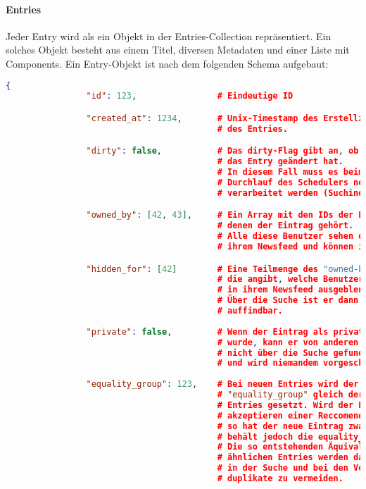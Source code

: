 	\paragraph{Entries} %
	\label{par:entries}
		
		Jeder Entry wird als ein Objekt in der Entries-Collection repräsentiert. Ein solches Objekt besteht aus einem Titel, diversen Metadaten und einer Liste mit Components. Ein Entry-Objekt ist nach dem folgenden Schema aufgebaut:

		\begin{lstlisting}[language=JSON]
			{
				"id": 123,                # Eindeutige ID

				"created_at": 1234,       # Unix-Timestamp des Erstellzeitpunktes 
				                          # des Entries.

				"dirty": false,           # Das dirty-Flag gibt an, ob sich
				                          # das Entry geändert hat.
				                          # In diesem Fall muss es beim nächsten
				                          # Durchlauf des Schedulers neu
				                          # verarbeitet werden (Suchindex, Vorschläge!).

				"owned_by": [42, 43],     # Ein Array mit den IDs der Benutzer,
				                          # denen der Eintrag gehört.
				                          # Alle diese Benutzer sehen den Eintrag in
				                          # ihrem Newsfeed und können ihn bearbeiten.

				"hidden_for": [42]        # Eine Teilmenge des "owned-by" Feldes, 
				                          # die angibt, welche Benutzer den Entry
				                          # in ihrem Newsfeed ausgeblendet haben.
				                          # Über die Suche ist er dann immernoch 
				                          # auffindbar.
				
				"private": false,         # Wenn der Eintrag als privat markiert
				                          # wurde, kann er von anderen Benutzern 
				                          # nicht über die Suche gefunden werden
				                          # und wird niemandem vorgeschlagen.
				
				"equality_group": 123,    # Bei neuen Entries wird der Wert 
				                          # "equality_group" gleich der id des
				                          # Entries gesetzt. Wird der Entry beim
				                          # akzeptieren einer Reccomendation geklont,
				                          # so hat der neue Eintrag zwar eine neue id,
				                          # behält jedoch die equality_group.
				                          # Die so entstehenden Äquivalenzklassen an 
				                          # ähnlichen Entries werden dafür genutzt, 
				                          # in der Suche und bei den Vorschlägen
				                          # duplikate zu vermeiden.
				

\end{lstlisting}
